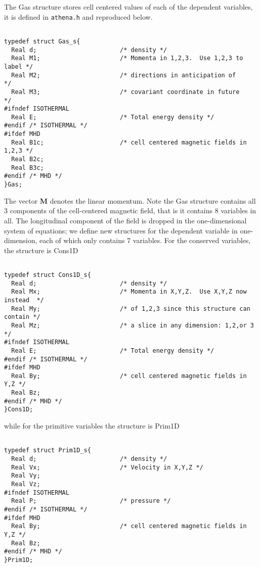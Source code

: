 The Gas structure stores cell centered values of each of the
dependent variables, it is defined in {\tt athena.h} and
reproduced below.

\footnotesize
\begin{verbatim}

typedef struct Gas_s{
  Real d;                       /* density */
  Real M1;                      /* Momenta in 1,2,3.  Use 1,2,3 to label */
  Real M2;                      /* directions in anticipation of         */
  Real M3;                      /* covariant coordinate in future        */
#ifndef ISOTHERMAL
  Real E;                       /* Total energy density */
#endif /* ISOTHERMAL */
#ifdef MHD
  Real B1c;                     /* cell centered magnetic fields in 1,2,3 */
  Real B2c;
  Real B3c;
#endif /* MHD */
}Gas;

\end{verbatim}
\normalsize

The vector {\bf M} denotes the linear momentum.
Note the Gas structure contains all 3 components of the cell-centered
magnetic field, that is it contains 8 variables in all.
The longitudinal component of the field is dropped in the one-dimensional
system of equations; we define new structures for the dependent variable
in one-dimension, each of which only contains 7 variables.
For the conserved variables, the structure is Cons1D

\footnotesize
\begin{verbatim}

typedef struct Cons1D_s{
  Real d;                       /* density */
  Real Mx;                      /* Momenta in X,Y,Z.  Use X,Y,Z now instead  */
  Real My;                      /* of 1,2,3 since this structure can contain */
  Real Mz;                      /* a slice in any dimension: 1,2,or 3        */
#ifndef ISOTHERMAL
  Real E;                       /* Total energy density */
#endif /* ISOTHERMAL */
#ifdef MHD
  Real By;                      /* cell centered magnetic fields in Y,Z */
  Real Bz;
#endif /* MHD */
}Cons1D;

\end{verbatim}
\normalsize

while for the primitive variables the structure is Prim1D

\footnotesize
\begin{verbatim}

typedef struct Prim1D_s{
  Real d;                       /* density */
  Real Vx;                      /* Velocity in X,Y,Z */
  Real Vy;
  Real Vz;
#ifndef ISOTHERMAL
  Real P;                       /* pressure */
#endif /* ISOTHERMAL */
#ifdef MHD
  Real By;                      /* cell centered magnetic fields in Y,Z */
  Real Bz;
#endif /* MHD */
}Prim1D;

\end{verbatim}
\normalsize

